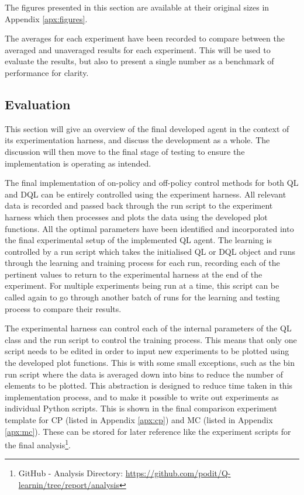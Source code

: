 \documentclass[hidelinks,journal]{IEEEtran}
\begin{document}
The figures presented in this section are available at their original sizes in Appendix \ref{apx:figures}.

The averages for each experiment have been recorded to compare between the averaged and unaveraged results for each experiment. This will be used to evaluate the results, but also to present a single number as a benchmark of performance for clarity.
\subsection{Evaluation}
\label{subsec:expEvl}
This section will give an overview of the final developed agent in the context of its experimentation harness, and discuss the development as a whole. The discussion will then move to the final stage of testing to ensure the implementation is operating as intended.

The final implementation of on-policy and off-policy control methods for both QL and DQL can be entirely controlled using the experiment harness. All relevant data is recorded and passed back through the run script to the experiment harness which then processes and plots the data using the developed plot functions. All the optimal parameters have been identified and incorporated into the final experimental setup of the implemented QL agent. The learning is controlled by a run script which takes the initialised QL or DQL object and runs through the learning and training process for each run, recording each of the pertinent values to return to the experimental harness at the end of the experiment. For multiple experiments being run at a time, this script can be called again to go through another batch of runs for the learning and testing process to compare their results.

The experimental harness can control each of the internal parameters of the QL class and the run script to control the training process. This means that only one script needs to be edited in order to input new experiments to be plotted using the developed plot functions. This is with some small exceptions, such as the bin run script where the data is averaged down into bins to reduce the number of elements to be plotted. This abstraction is designed to reduce time taken in this implementation process, and to make it possible to write out experiments as individual Python scripts. This is shown in the final comparison experiment template for CP (listed in Appendix \ref{apx:cp}) and MC (listed in Appendix \ref{apx:mc}). These can be stored for later reference like the experiment scripts for the final analysis\footnote{GitHub - Analysis Directory: \url{https://github.com/podit/Q-learnin/tree/report/analysis}}.
\end{document}

